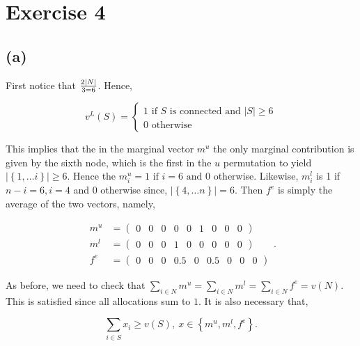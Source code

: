 \documentclass[american]{scrartcl}
\newcommand{\set}[1]{\left\{#1\right\}}
\newcommand{\abs}[1]{\left\lvert #1 \right\rvert}
\begin{document}
\section*{Exercise 4}

\subsection*{(a)}

First notice that $2 \abs{N} \over 3 = 6$. Hence,

\begin{equation}
    v^L(S) = \begin{cases}
        1  \text{ if $S$ is connected and } \abs{S} \geq 6 \\
        0 \text{ otherwise }
    \end{cases}
\end{equation}


This implies that the in the marginal vector $m^u$ the only marginal contribution is given by the sixth node, which is the first in the $u$ permutation to yield $\abs{\set{1, \dots i}} \geq 6$. Hence the $m^u_i = 1 \text{ if } i = 6 \text{ and } 0$ otherwise. Likewise, $m^l_i$ is 1 if $n - i = 6, i = 4$ and $0$ otherwise since, $\abs{\set{4, \dots n}} = 6$. Then $f^e$ is simply the average of the two vectors, namely,

\begin{equation}
    \begin{split}
        m^u &= \begin{pmatrix} 0 &0 &0 &0 &0 &1 &0 &0 &0 \end{pmatrix} \\
        m^l &= \begin{pmatrix} 0 &0 &0 &1 &0 &0 &0 &0 &0 \end{pmatrix} \\
        f^e &= \begin{pmatrix} 0 &0 &0 &0.5 &0 &0.5 &0 &0 &0 \end{pmatrix}
    \end{split}.
\end{equation}

As before, we need to check that $\sum_{i \in N} m^u = \sum_{i \in N} m^l = \sum_{i \in N} f^e = v(N) $. This is satisfied since all allocations sum to $1$. It is also necessary that,

\begin{equation}
    \sum_{i \in S} x_i \geq v(S), \ x \in \set{m^u, m^l, f^e}.
\end{equation}
\end{document}
